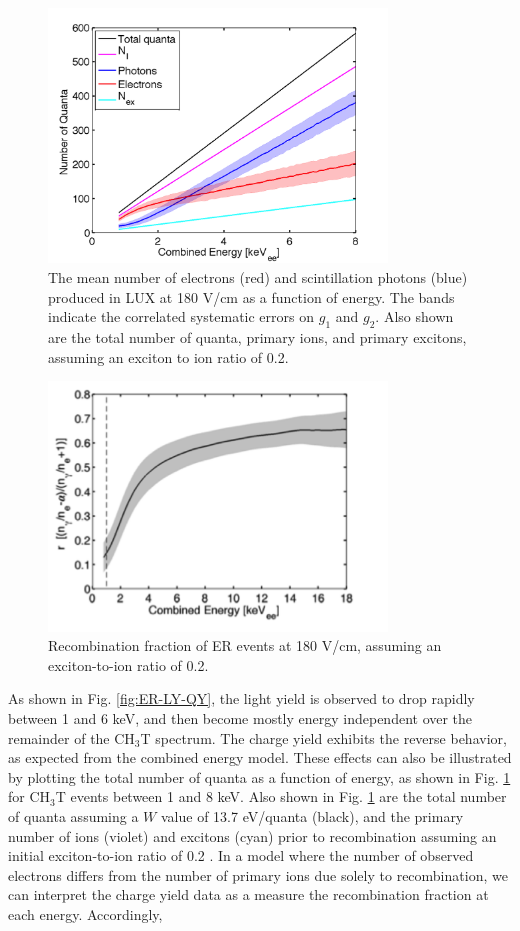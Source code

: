\begin{figure}[h!]\centering
\includegraphics[width=90mm]{fig/quanta-vs-energy.png}
\caption{The mean number of electrons (red) and scintillation photons (blue) produced in LUX at 180 V/cm as a function of energy. The bands indicate the correlated systematic errors on $g_1$ and $g_2$. Also shown are the total number of quanta, primary ions, and primary excitons, assuming an exciton to ion ratio of 0.2. }
\label{fig:quanta-vs-energy}
\end{figure}


\begin{figure}[h!]\centering
\includegraphics[width=90mm]{fig/recombination.png}
\caption{Recombination fraction of ER events at 180 V/cm, assuming an exciton-to-ion ratio of 0.2.}
\label{fig:recombination}
\end{figure}


As shown in Fig. \ref{fig:ER-LY-QY}, the light yield is observed to drop rapidly between 1 and 6 keV, and then become mostly energy independent over the remainder of the CH$_3$T spectrum. The charge yield exhibits the reverse behavior, as expected from the combined energy model. These effects can also be illustrated by plotting the total number of quanta as a function of energy, as shown in Fig. \ref{fig:quanta-vs-energy} for CH$_3$T events between 1 and 8 keV. Also shown in Fig. \ref{fig:quanta-vs-energy} are the total number of quanta assuming a $W$ value of 13.7 eV/quanta (black), and the primary number of ions (violet) and excitons (cyan) prior to recombination assuming an initial exciton-to-ion ratio of 0.2 \cite{alpha-value}. In a model where the number of observed electrons differs from the number of primary ions due solely to recombination, we can interpret the charge yield data as a measure the recombination fraction at each energy. Accordingly, 

